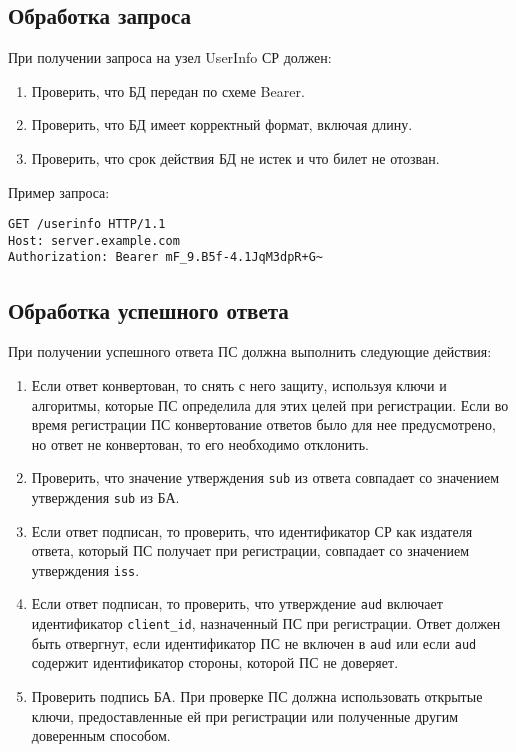 \label{REQRESP.UserInfo}

\subsection{Обработка запроса}\label{REQRESP.UserInfo.Req}

При получении запроса на узел UserInfo СР должен: 
\begin{enumerate}
\item 
Проверить, что БД передан по схеме Bearer.

\item 
Проверить, что БД имеет корректный формат, включая длину.

\item 
Проверить, что срок действия БД не истек и что билет не отозван.
\end{enumerate}

Пример запроса:
%
\begin{lstlisting}
GET /userinfo HTTP/1.1
Host: server.example.com
Authorization: Bearer mF_9.B5f-4.1JqM3dpR+G~
\end{lstlisting}

\subsection{Обработка успешного ответа}\label{REQRESP.UserInfo.Resp}

При получении успешного ответа ПС должна выполнить следующие действия:
%
\begin{enumerate}
\item 
Если ответ конвертован, то снять с него защиту, используя ключи и алгоритмы, 
которые ПС определила для этих целей при регистрации.
%
Если во время регистрации ПС конвертование ответов было для нее
предусмотрено, но ответ не конвертован, то его необходимо отклонить.

\item 
Проверить, что значение утверждения \lstinline{sub} из
ответа совпадает со значением утверждения \lstinline{sub} из БА.

\item
Если ответ подписан, то проверить, что идентификатор СР как
издателя ответа, который ПС получает при регистрации, совпадает со значением
утверждения \lstinline{iss}.

\item 
Если ответ подписан, то проверить, что утверждение \lstinline{aud} включает 
идентификатор \lstinline{client_id}, назначенный ПС при регистрации.
%
Ответ должен быть отвергнут, если идентификатор ПС не включен в \lstinline{aud}
или если \lstinline{aud} содержит идентификатор стороны, которой ПС не 
доверяет. 

\item 
Проверить подпись БА. При проверке ПС должна использовать открытые ключи, 
предоставленные ей при регистрации или полученные другим доверенным способом. 
\end{enumerate}

